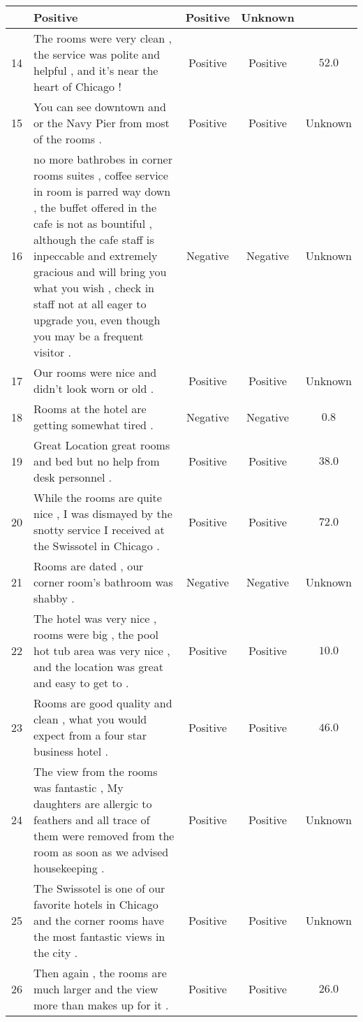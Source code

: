 \begin{landscape}
\begin{center}
\begin{longtable}{rm{9cm}ccc}
& Positive & Positive & Unknown \\ \hline
14 & The rooms were very clean , the service was polite and helpful , and it's near the heart of Chicago !
& Positive & Positive & $52.0$ \\ \hline
15 & You can see downtown and or the Navy Pier from most of the rooms .
& Positive & Positive  & Unknown \\ \hline
16 & no more bathrobes in corner rooms suites , coffee service in room is parred way down , the buffet offered in the cafe is not as bountiful , although the cafe staff is inpeccable and extremely gracious and will bring you what you wish , check in staff not at all eager to upgrade you, even though you may be a frequent visitor .
& Negative & Negative  & Unknown \\ \hline
17 & Our rooms were nice and didn't look worn or old .
& Positive & Positive  & Unknown \\ \hline
18 & Rooms at the hotel are getting somewhat tired .
& Negative & Negative & $0.8$\\ \hline
19 & Great Location great rooms and bed but no help from desk personnel .
& Positive & Positive & $38.0$ \\ \hline
20 & While the rooms are quite nice , I was dismayed by the snotty service I received at the Swissotel in Chicago .
& Positive & Positive & $72.0$ \\ \hline
21 & Rooms are dated , our corner room's bathroom was shabby .
& Negative & Negative & Unknown \\ \hline
22 & The hotel was very nice , rooms were big , the pool hot tub area was very nice , and the location was great and easy to get to .
& Positive & Positive & $10.0$ \\ \hline
23 &Rooms are good quality and clean , what you would expect from a four star business hotel .
& Positive & Positive & $46.0$ \\ \hline
24 &The view from the rooms was fantastic , My daughters are allergic to feathers and all trace of them were removed from the room as soon as we advised housekeeping .
& Positive & Positive & Unknown \\ \hline
25 & The Swissotel is one of our favorite hotels in Chicago and the corner rooms have the most fantastic views in the city .
& Positive & Positive & Unknown \\ \hline
26 & Then again , the rooms are much larger and the view more than makes up for it .
& Positive & Positive & $26.0$ \\ \hline

\end{longtable}
\end{center}
\end{landscape}
